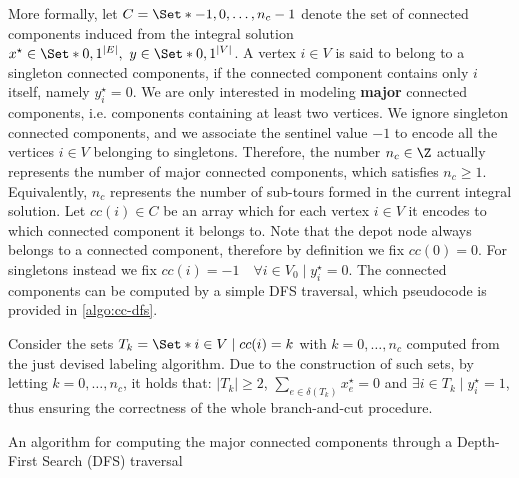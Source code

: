 More formally,
let $C = \Set*{-1, 0, \dots, n_c - 1}$ denote the set of connected components
induced from the integral solution $x^\star \in \Set*{0, 1}^{|E|},\ y \in \Set*{0, 1}^{|V|}$.
A vertex $i \in V$ is said to belong to a singleton connected components,
if the connected component contains only $i$ itself, namely $y^\star_i = 0$.
We are only interested in modeling \textbf{major} connected components,
i.e. components containing at least two vertices.
We ignore singleton connected components,
and we associate the sentinel value $-1$ to encode all the vertices $i \in V$ belonging to singletons.
Therefore, the number $n_c \in \Z$ actually represents the number
of major connected components, which satisfies $n_c \ge 1$.
Equivalently,
$n_c$ represents the number of sub-tours formed in the current integral solution.
Let $cc(i) \in C$ be an array
which for each vertex $i \in V$ it encodes to which connected component it belongs to.
Note that the depot node always belongs to a connected component,
therefore by definition we fix $cc(0) = 0$.
For singletons instead we fix $cc(i) = -1  \quad \forall i \in V_0 \mid y^\star_i = 0$.
The connected components can be computed
by a simple DFS traversal, which pseudocode is provided in \cref{algo:cc-dfs}.

Consider the sets $T_k = \Set*{i \in V \mid cc(i) = k}$ with $k = 0, \dots, n_c$
computed from the just devised labeling algorithm.
Due to the construction of such sets,
by letting $k = 0, \dots, n_c$,
it holds that:
$|T_k| \ge 2$,
$\sum_{e \in \delta(T_k)} x^\star_e = 0$
and $\exists i \in T_k \mid y^\star_i = 1$,
thus ensuring the correctness of the whole branch-and-cut procedure.

\begin{algorithm}
	\caption{An algorithm for computing the major connected components through a Depth-First Search (DFS) traversal}
	
	\label{algo:cc-dfs}
\end{algorithm}

